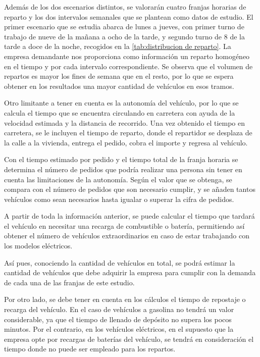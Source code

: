 Además de los dos escenarios distintos, se valorarán cuatro franjas horarias de reparto y los dos intervalos semanales que se plantean como datos de estudio. El primer escenario que se estudia abarca de lunes a jueves, con primer turno de trabajo de nueve de la mañana a ocho de la tarde, y segundo turno de 8 de la tarde a doce de la noche, recogidos en la \autoref{tab:distribucion de reparto}. La empresa demandante nos proporciona como información un reparto homogéneo en el tiempo y por cada intervalo correspondiente. Se observa que el volumen de repartos es mayor los fines de semana que en el resto, por lo que se espera obtener en los resultados una mayor cantidad de vehículos en esos tramos.

Otro limitante a tener en cuenta es la autonomía del vehículo, por lo que se calcula el tiempo que se encuentra circulando en carretera con ayuda de la velocidad estimada y la distancia de recorrido. Una vez obtenido el tiempo en carretera, se le incluyen el tiempo de reparto, donde el repartidor se desplaza de la calle a la vivienda, entrega el pedido, cobra el importe y regresa al vehículo.

Con el tiempo estimado por pedido y el tiempo total de la franja horaria se determina el número de pedidos que podría realizar una persona sin tener en cuenta las limitaciones de la autonomía. Según el valor que se obtenga, se compara con el número de pedidos que son necesario cumplir, y se añaden tantos vehículos como sean necesarios hasta igualar o superar la cifra de pedidos.

A partir de toda la información anterior, se puede calcular el tiempo que tardará el vehículo en necesitar una recarga de combustible o batería, permitiendo así obtener el número de vehículos extraordinarios en caso de estar trabajando con los modelos eléctricos.

Así pues, conociendo la cantidad de vehículos en total, se podrá estimar la cantidad de vehículos que debe adquirir la empresa para cumplir con la demanda de cada una de las franjas de este estudio.

Por otro lado, se debe tener en cuenta en los cálculos el tiempo de repostaje o recarga del vehículo. En el caso de vehículos a gasolina no tendrá un valor considerable, ya que el tiempo de llenado de depósito no supera los pocos minutos. Por el contrario, en los vehículos eléctricos, en el supuesto que la empresa opte por recargas de baterías del vehículo, se tendrá en consideración el tiempo donde no puede ser empleado para los repartos.

